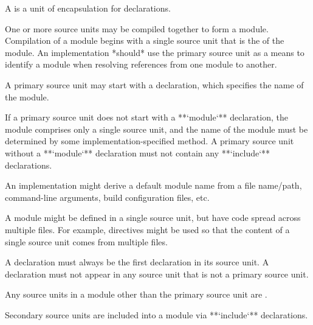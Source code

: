 
A  is a unit of encapsulation for declarations.


One or more source units may be compiled together to form a module.
Compilation of a module begins with a single source unit that is the  of the module.
An implementation *should* use the primary source unit as a means to identify a module when resolving references from one module to another.

A primary source unit may start with a  declaration, which specifies the name of the module.

\begin{Syntax}
      \code{;}
\end{Syntax}

If a primary source unit does not start with a **`module`** declaration, the module comprises only a single source unit, and the name of the module must be determined by some implementation-specified method.
A primary source unit without a **`module`** declaration must not contain any **`include`** declarations.

\begin{Note}
An implementation might derive a default module name from a file name/path, command-line arguments, build configuration files, etc.
\end{Note}

\begin{Note}
A module might be defined in a single source unit, but have code spread across multiple files.
For example,  directives might be used so that the content of a single source unit comes from multiple files.
\end{Note}

A  declaration must always be the first declaration in its source unit.
A  declaration must not appear in any source unit that is not a primary source unit.


Any source units in a module other than the primary source unit are .


Secondary source units are included into a module via **`include`** declarations.


